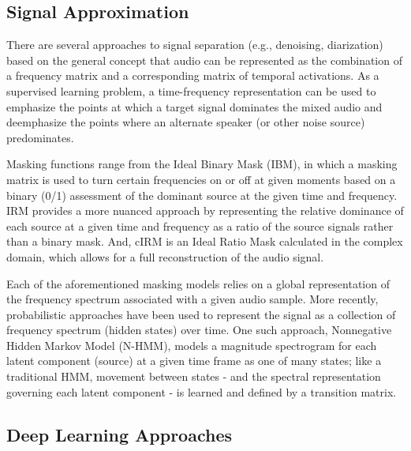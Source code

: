 \documentclass[journal, a4paper]{IEEEtran}
\begin{document}
\subsection{Signal Approximation}

There are several approaches to signal separation (e.g., denoising, diarization) based on the general concept that audio can be represented as the combination of a frequency matrix and a corresponding matrix of temporal activations. As a supervised learning problem, a time-frequency  representation can be used to emphasize the points at which a target signal dominates the mixed audio and deemphasize the points where an alternate speaker (or other noise source) predominates.\cite{DBLP:journals/corr/abs-1708-07524}

Masking functions range from the Ideal Binary Mask (IBM), in which a masking matrix is used to turn certain frequencies on or off at given moments based on a binary (0/1) assessment of the dominant source at the given time and frequency.\cite{DBLP:journals/corr/abs-1708-07524} IRM provides a more nuanced approach by representing the relative dominance of each source at a given time and frequency as a ratio of the source signals rather than a binary mask. And, cIRM is an Ideal Ratio Mask calculated in the complex domain, which allows for a full reconstruction of the audio signal. \cite{DBLP:journals/corr/abs-1708-07524} 

Each of the aforementioned masking models relies on a global representation of the frequency spectrum associated with a given audio sample.  More recently, probabilistic approaches have been used to represent the signal as a collection of frequency spectrum (hidden states) over time. One such approach, Nonnegative Hidden Markov Model (N-HMM), models a magnitude spectrogram for each latent component (source) at a given time frame as one of many states; like a traditional HMM, movement between states - and the spectral representation governing each latent component - is learned and defined by a transition matrix. 
\cite{10.1007/978-3-642-15995-4_18}

\subsection{Deep Learning Approaches}
\end{document}
